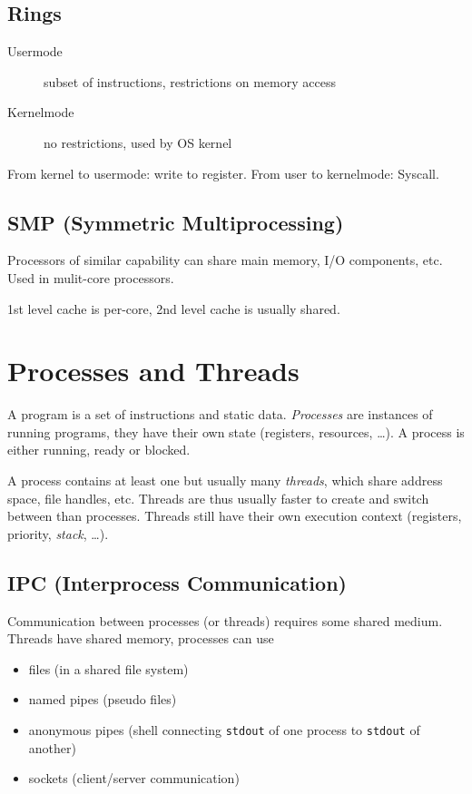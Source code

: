 \documentclass{article}
\newcommand{\code}[1]{\texttt{#1}}
\begin{document}
\begin{multicols}{1}
\subsection*{Rings}

\begin{description}
    \item[Usermode] subset of instructions, restrictions on memory access
    \item[Kernelmode] no restrictions, used by OS kernel 
\end{description}

From kernel to usermode: write to register. From user to kernelmode: Syscall.

\subsection*{SMP (Symmetric Multiprocessing)}

Processors of similar capability can share main memory, I/O components, etc. Used in mulit-core processors.

1st level cache is per-core, 2nd level cache is usually shared.

\section*{Processes and Threads}

A program is a set of instructions and static data. \emph{Processes} are instances of running programs, they have their own state (registers, resources, \ldots). A process is either running, ready or blocked.

A process contains at least one but usually many \emph{threads}, which share address space, file handles, etc. Threads are thus usually faster to create and switch between than processes. Threads still have their own execution context (registers, priority, \emph{stack}, \ldots).

\subsection*{IPC (Interprocess Communication)}

Communication between processes (or threads) requires some shared medium. Threads have shared memory, processes can use
\begin{itemize}
    \item files (in a shared file system)
    \item named pipes (pseudo files)
    \item anonymous pipes (shell connecting \code{stdout} of one process to \code{stdout} of another)
    \item sockets (client/server communication)
\end{itemize}


\end{multicols}
\end{document}
